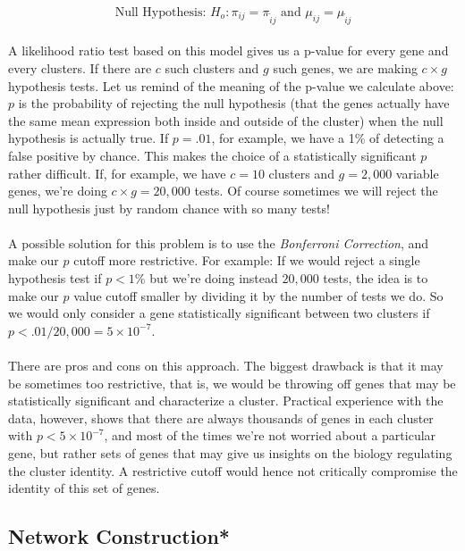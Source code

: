$$
\mbox{Null Hypothesis: } H_o: \pi_{ij} = \pi_{\tilde{i}j} \mbox{ and } \mu_{ij} = \mu_{\tilde{i}j}
$$
\\
A likelihood ratio test based on this model gives us a p-value for every gene and every clusters. If there are $c$ such clusters and $g$ such genes, we are making $c \times g$ hypothesis tests. Let us remind of the meaning of the p-value we calculate above: $p$ is the probability of rejecting the null hypothesis (that the genes actually have the same mean expression both inside and outside of the cluster) when the null hypothesis is actually true. If $p = .01$, for example, we have a 1\% of detecting a false positive by chance. This makes the choice of a statistically significant $p$ rather difficult. If, for example, we have $c = 10$ clusters and $g = 2,000$ variable genes, we're doing $c \times g = 20,000$ tests. Of course sometimes we will reject the null hypothesis just by random chance with so many tests! \\
\\
A possible solution for this problem is to use the \emph{Bonferroni Correction}, and make our $p$ cutoff more restrictive. For example: If we would reject a single hypothesis test if $p < 1\%$ but we're doing instead $20,000$ tests, the idea is to make our $p$ value cutoff smaller by dividing it by the number of tests we do. So we would only consider a gene statistically significant between two clusters if $p < .01 / 20,000 = 5 \times 10^{-7}$. \\
\\
There are pros and cons on this approach. The biggest drawback is that it may be sometimes too restrictive, that is, we would be throwing off genes that may be statistically significant and characterize a cluster. Practical experience with the data, however, shows that there are always thousands of genes in each cluster with $p < 5 \times 10^{-7}$, and most of the times we're not worried about a particular gene, but rather sets of genes that may give us insights on the biology regulating the cluster identity. A restrictive cutoff would hence not critically compromise the identity of this set of genes.

\subsection{Network Construction*}

